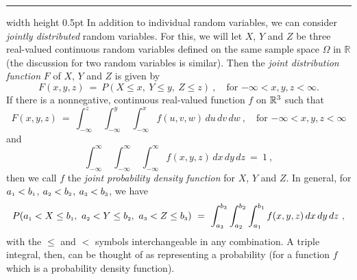 \hrule width \textwidth height 0.5pt
\smallskip
In addition to individual random variables, we can consider \emph{jointly distributed} random variables. For this, we
will let $X$, $Y$ and $Z$ be three real-valued continuous random variables defined on the same sample space
$\Omega$ in $\mathbb{R}$ (the discussion for two random variables is similar). Then the \emph{joint distribution
function} $F$ of $X$, $Y$ and $Z$ is given by
\begin{equation}
 F(x,y,z) ~=~ P(X \le x,~Y \le y,~Z \le z)~, \quad \text{for $-\infty < x,y,z < \infty$.}
\end{equation}
If there is a nonnegative, continuous real-valued function $f$ on $\mathbb{R}^{3}$ such that
\begin{equation}\label{eqn:pdf3}
 F(x,y,z) 
 ~=~ 
 \int_{-\infty}^z \,\,
 \int_{-\infty}^y \,\,\int_{-\infty}^x 
 f(u,v,w)\,du\,dv\,dw~,
 \quad \text{for $-\infty < x,y,z < \infty$}
\end{equation}
and
\begin{equation}\label{eqn:pdfint3}
\int_{-\infty}^{\infty}\,\, \int_{-\infty}^{\infty}\,\, \int_{-\infty}^{\infty} f(x,y,z)\,dx\,dy\,dz ~=~ 1 ~,
\end{equation}
then we call $f$ the \emph{joint probability density function}  for $X$, $Y$ and $Z$.
In general, for $a_{\scriptscriptstyle 1} < b_{\scriptscriptstyle 1}$, $a_{\scriptscriptstyle 2} < b_{\scriptscriptstyle 2}$, $a_{\scriptscriptstyle 3} < b_{\scriptscriptstyle 3}$, we have
\begin{equation}\label{eqn:pdfprob3}
 P(a_{\scriptscriptstyle 1} < X \le b_{\scriptscriptstyle 1},~a_{\scriptscriptstyle 2} < Y \le b_{\scriptscriptstyle 2},~a_{\scriptscriptstyle 3} < Z \le b_{\scriptscriptstyle 3}) ~=~
 \int_{a_{\scriptscriptstyle 3}}^{b_{\scriptscriptstyle 3}}\int_{a_{\scriptscriptstyle 2}}^{b_{\scriptscriptstyle 2}}\int_{a_{\scriptscriptstyle 1}}^{b_{\scriptscriptstyle 1}} f(x,y,z)\,dx\,dy\,dz~,
\end{equation}
with the $\le$ and $<$ symbols interchangeable in any combination. 
A triple integral, then, can be thought of as
representing a probability (for a function $f$ which is a probability density function).

